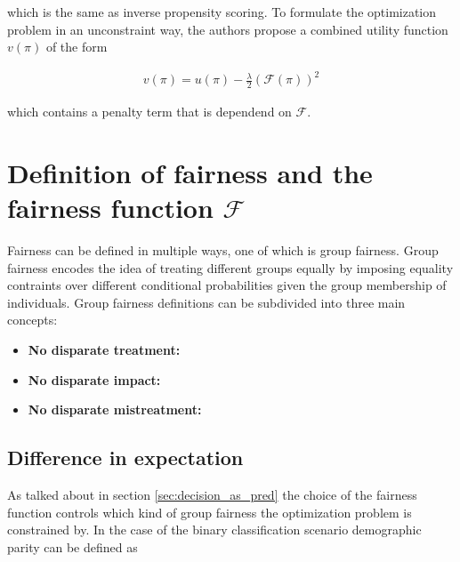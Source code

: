 \documentclass[
	a4paper,
	11pt
	]{article}
\begin{document}
which is the same as inverse propensity scoring. To formulate the optimization problem in an unconstraint way, the authors propose a combined utility function $v(\pi)$ of the form 

\begin{align*}
    v(\pi) = u(\pi) - \frac{\lambda}{2}(\mathcal{F}(\pi))^2
\end{align*}

which contains a penalty term that is dependend on $\mathcal{F}$. 

\section{Definition of fairness and the fairness function $\mathcal{F}$}
Fairness can be defined in multiple ways, one of which is group fairness. Group fairness encodes the idea of treating different groups equally by imposing equality contraints over different conditional probabilities given the group membership of individuals. Group fairness definitions can be subdivided into three main concepts:

\begin{itemize}
    \item \textbf{No disparate treatment:}
    \item \textbf{No disparate impact:}
    \item \textbf{No disparate mistreatment:}
\end{itemize}

\subsection{Difference in expectation}
\label{sec:diff_in_exp}
As talked about in section \ref{sec:decision_as_pred} the choice of the fairness function controls which kind of group fairness the optimization problem is constrained by. In the case of the binary classification scenario demographic parity can be defined as
\end{document}
